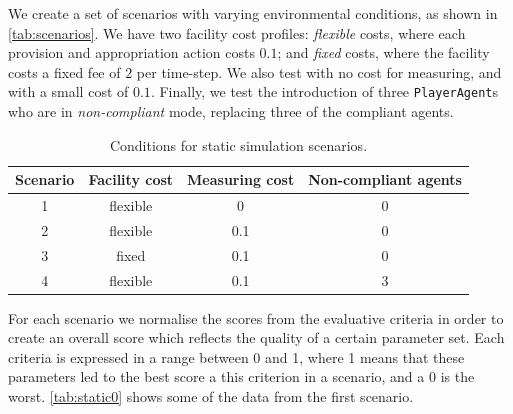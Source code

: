 We create a set of scenarios with varying environmental conditions, as shown
in \autoref{tab:scenarios}. We have two facility cost profiles:
\emph{flexible} costs, where each provision and appropriation action costs
$0.1$; and \emph{fixed} costs, where the facility costs a fixed fee of $2$ per
time-step. We also test with no cost for measuring, and with a small cost of
$0.1$. Finally, we test the introduction of three \texttt{PlayerAgent}s who are in
\emph{non-compliant} mode, replacing three of the compliant agents.



\begin{table}
\centering
\caption{Conditions for static simulation scenarios.}\label{tab:scenarios}
\begin{tabular}{c||c|c|c}
Scenario & Facility cost & Measuring cost & Non-compliant agents \\
\hline
1 & flexible & 0 & 0 \\
2 & flexible & 0.1 & 0 \\
3 & fixed & 0.1 & 0 \\
4 & flexible & 0.1 & 3 \\
\end{tabular}
\end{table}

For each scenario we normalise the scores from the evaluative criteria
in order to create an overall score which reflects the quality of a certain
parameter set. Each criteria is expressed in a range between 0 and 1, where 1
means that these parameters led to the best score a this criterion in a
scenario, and a 0 is the worst. \autoref{tab:static0} shows some of the data
from the first scenario.

